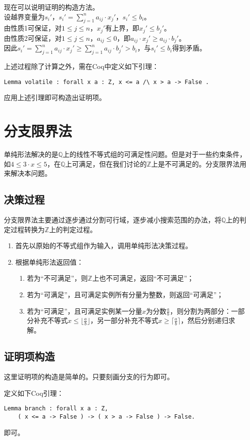现在可以说明证明的构造方法。\\
设越界变量为$s_i'$，$s_i' = \sum_{j=1}^{n} a_{ij} \cdot x_j'$，$s_i' \leq b_i$。\\
由性质1可保证，对$1 \leq j \leq n$，$x_j'$有上界，即$x_j' \leq b_j'$。\\
由性质2可保证，对$1 \leq j \leq n$，$a_{ij} \leq 0$，即$a_{ij} \cdot x_j' \geq a_{ij} \cdot b_j'$。\\
因此$s_i' = \sum_{j=1}^{n} a_{ij} \cdot x_j' \geq \sum_{j=1}^{n} a_{ij} \cdot b_j' > b_i$，与$s_i' \leq b_i$得到矛盾。

上述过程除了计算之外，需在Coq中定义如下引理：
\begin{verbatim}
Lemma volatile : forall x a : Z, x <= a /\ x > a -> False .
\end{verbatim}
应用上述引理即可构造出证明项。

\section{分支限界法}
单纯形法解决的是$\mathbb{Q}$上的线性不等式组的可满足性问题。但是对于一些约束条件，如$4 \leq 3 \cdot x \leq 5$，在$\mathbb{Q}$上可满足，但在我们讨论的$\mathbb{Z}$上是不可满足的。分支限界法用来解决本问题。
\subsection{决策过程}
分支限界法主要通过逐步通过分割可行域，逐步减小搜索范围的办法，将$\mathbb{Q}$上的判定过程转换为$\mathbb{Z}$上的判定过程。
\begin{enumerate}
  \item 首先以原始的不等式组作为输入，调用单纯形法决策过程。
  \item 根据单纯形法返回值：
    \begin{enumerate}
      \item 若为``不可满足''，则$\mathbb{Z}$上也不可满足，返回``不可满足''；
      \item 若为``可满足''，且可满足实例所有分量为整数，则返回``可满足''；
      \item 若为``可满足''，且可满足实例某一分量$x$为分数$\frac{a}{b}$，则分割为两部分：一部分补充不等式$x \leq \lfloor \frac{a}{b} \rfloor$，另一部分补充不等式$x \geq \lceil \frac{a}{b} \rceil$，然后分别递归求解。
    \end{enumerate}
\end{enumerate}

\subsection{证明项构造}
这里证明项的构造是简单的。只要刻画分支的行为即可。

定义如下Coq引理：
\begin{verbatim}
Lemma branch : forall x a : Z,
    ( x <= a -> False ) -> ( x > a -> False ) -> False.
\end{verbatim}
即可。
